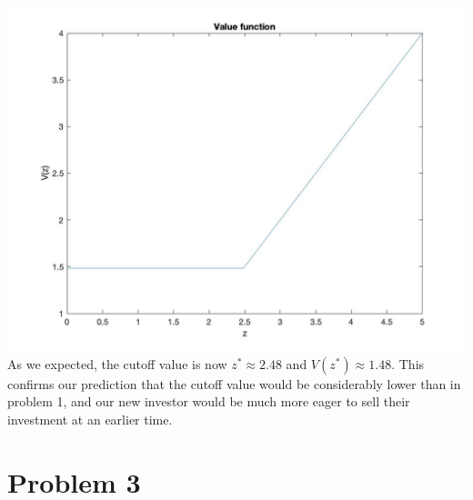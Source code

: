 \documentclass[
]{article}
\begin{document}
\includegraphics{images/valfunc2.jpg} As we expected, the cutoff value
is now \(z^* \approx 2.48\) and \(V(z^*) \approx 1.48\). This confirms
our prediction that the cutoff value would be considerably lower than in
problem 1, and our new investor would be much more eager to sell their
investment at an earlier time.

\hypertarget{problem-3}{%
\section{Problem 3}\label{problem-3}}
\end{document}
